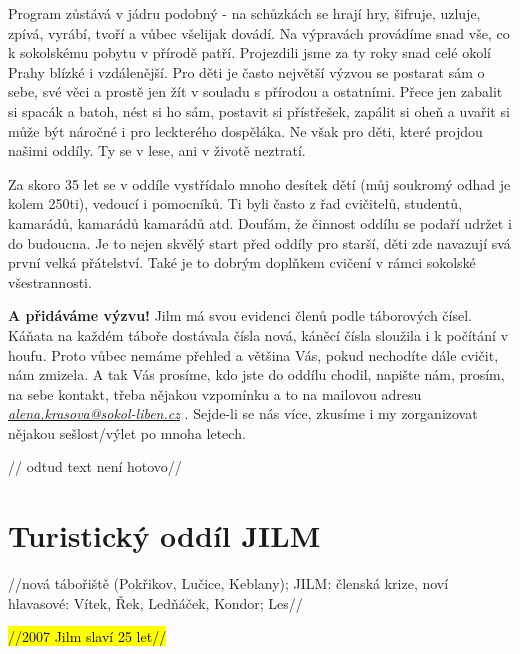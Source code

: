 Program zůstává v jádru podobný - na schůzkách se hrají hry, šifruje,
uzluje, zpívá, vyrábí, tvoří a vůbec všelijak dovádí. Na výpravách
provádíme snad vše, co k sokolskému pobytu v přírodě patří. Projezdili
jsme za ty roky snad celé okolí Prahy blízké i vzdálenější. Pro děti je
často největší výzvou se postarat sám o sebe, své věci a prostě jen žít
v souladu s přírodou a ostatními. Přece jen zabalit si spacák a batoh,
nést si ho sám, postavit si přístřešek, zapálit si oheň a uvařit si může
být náročné i pro leckterého dospěláka. Ne však pro děti, které projdou
našimi oddíly. Ty se v lese, ani v životě neztratí.

Za skoro 35 let se v oddíle vystřídalo mnoho desítek dětí (můj soukromý
odhad je kolem 250ti), vedoucí i pomocníků. Ti byli často z řad
cvičitelů, studentů, kamarádů, kamarádů kamarádů atd. Doufám, že činnost
oddílu se podaří udržet i do budoucna. Je to nejen skvělý start před
oddíly pro starší, děti zde navazují svá první velká přátelství. Také je
to dobrým doplňkem cvičení v rámci sokolské všestrannosti.

\textbf{A přidáváme výzvu!} Jilm má svou evidenci členů podle táborových
čísel. Káňata na každém táboře dostávala čísla nová, káněcí čísla
sloužila i k počítání v houfu. Proto vůbec nemáme přehled a většina Vás,
pokud nechodíte dále cvičit, nám zmizela. A tak Vás prosíme, kdo jste do
oddílu chodil, napište nám, prosím, na sebe kontakt, třeba nějakou
vzpomínku a to na mailovou adresu
\emph{\ul{alena.krasova@sokol-liben.cz}} . Sejde-li se nás více, zkusíme
i my zorganizovat nějakou sešlost/výlet po mnoha letech.

// odtud text není hotovo//

\section{Turistický oddíl JILM}\label{turistickuxfd-odduxedl-jilm}

//nová tábořiště (Pokřikov, Lučice, Keblany); JILM: členská krize, noví
hlavasové: Vítek, Řek, Ledňáček, Kondor; Les//

\hl{//2007 Jilm slaví 25 let//}

